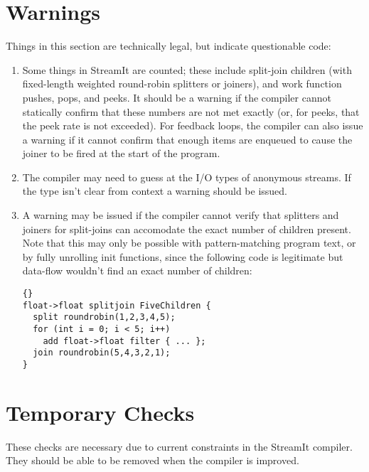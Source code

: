 \documentclass[11pt]{article}
\begin{document}
\section{Warnings}

Things in this section are technically legal, but indicate
questionable code:

\begin{enumerate}
\item Some things in StreamIt are counted; these include split-join
  children (with fixed-length weighted round-robin splitters or
  joiners), and work function pushes, pops, and peeks.  It should be a
  warning if the compiler cannot statically confirm that these numbers
  are not met exactly (or, for peeks, that the peek rate is not
  exceeded).   For feedback loops, the compiler can also issue a
  warning if it cannot confirm that enough items are enqueued to cause
  the joiner to be fired at the start of the program.
\item The compiler may need to guess at the I/O types of anonymous
  streams.  If the type isn't clear from context a warning should be
  issued.
\item A warning may be issued if the compiler cannot verify that
  splitters and joiners for split-joins can accomodate the exact
  number of children present.  Note that this may only be possible
  with pattern-matching program text, or by fully unrolling init
  functions, since the following code is legitimate but data-flow
  wouldn't find an exact number of children:

\begin{lstlisting}{}
float->float splitjoin FiveChildren {
  split roundrobin(1,2,3,4,5);
  for (int i = 0; i < 5; i++)
    add float->float filter { ... };
  join roundrobin(5,4,3,2,1);
}
\end{lstlisting}
\end{enumerate}

\section{Temporary Checks}

These checks are necessary due to current constraints in the StreamIt
compiler.  They should be able to be removed when the compiler is
improved.
\end{document}
